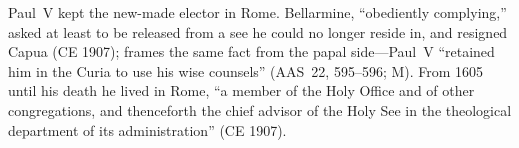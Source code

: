 
Paul~V kept the new-made elector in Rome. Bellarmine, ``obediently
complying,'' asked at least to be released from a see he could no
longer reside in, and resigned Capua (CE 1907); 
frames the same fact from the papal side---Paul~V ``retained him in
the Curia to use his wise counsels'' (AAS~22, 595--596; M). From
1605 until his death he lived in Rome, ``a member of the Holy
Office and of other congregations, and thenceforth the chief
advisor of the Holy See in the theological department of its
administration'' (CE 1907).
